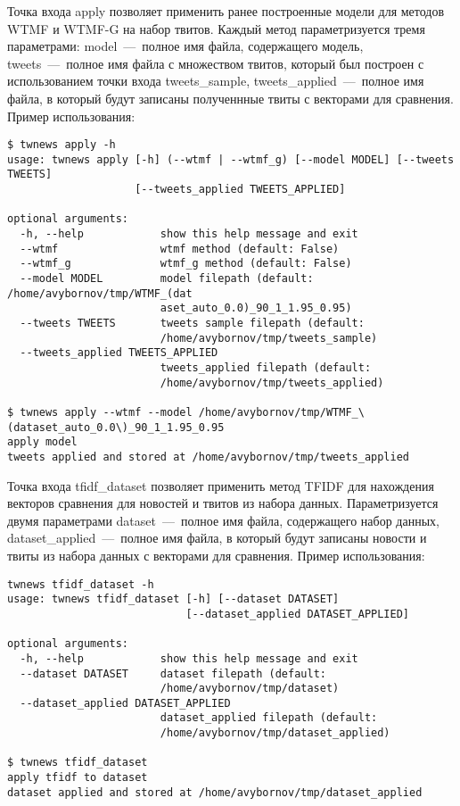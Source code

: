         Точка входа apply позволяет применить ранее построенные модели для методов WTMF и WTMF-G на набор твитов.
        Каждый метод параметризуется тремя параметрами: model~---~полное имя файла, содержащего модель,
        tweets~---~полное имя файла с множеством твитов, который был построен с использованием точки входа tweets\_sample,
        tweets\_applied~---~полное имя файла, в который будут записаны полученнные твиты с векторами для сравнения.
        Пример использования:
        \begin{lstlisting}
$ twnews apply -h
usage: twnews apply [-h] (--wtmf | --wtmf_g) [--model MODEL] [--tweets TWEETS]
                    [--tweets_applied TWEETS_APPLIED]

optional arguments:
  -h, --help            show this help message and exit
  --wtmf                wtmf method (default: False)
  --wtmf_g              wtmf_g method (default: False)
  --model MODEL         model filepath (default: /home/avybornov/tmp/WTMF_(dat
                        aset_auto_0.0)_90_1_1.95_0.95)
  --tweets TWEETS       tweets sample filepath (default:
                        /home/avybornov/tmp/tweets_sample)
  --tweets_applied TWEETS_APPLIED
                        tweets_applied filepath (default:
                        /home/avybornov/tmp/tweets_applied)

$ twnews apply --wtmf --model /home/avybornov/tmp/WTMF_\(dataset_auto_0.0\)_90_1_1.95_0.95
apply model
tweets applied and stored at /home/avybornov/tmp/tweets_applied

        \end{lstlisting}


        Точка входа tfidf\_dataset позволяет применить метод TFIDF для нахождения векторов сравнения для новостей и твитов из набора данных.
        Параметризуется двумя параметрами
        dataset~---~полное имя файла, содержащего набор данных,
        dataset\_applied~---~полное имя файла, в который будут записаны новости и твиты из набора данных с векторами для сравнения.
        Пример использования:
        \begin{lstlisting}
twnews tfidf_dataset -h
usage: twnews tfidf_dataset [-h] [--dataset DATASET]
                            [--dataset_applied DATASET_APPLIED]

optional arguments:
  -h, --help            show this help message and exit
  --dataset DATASET     dataset filepath (default:
                        /home/avybornov/tmp/dataset)
  --dataset_applied DATASET_APPLIED
                        dataset_applied filepath (default:
                        /home/avybornov/tmp/dataset_applied)

$ twnews tfidf_dataset
apply tfidf to dataset
dataset applied and stored at /home/avybornov/tmp/dataset_applied
        \end{lstlisting}

